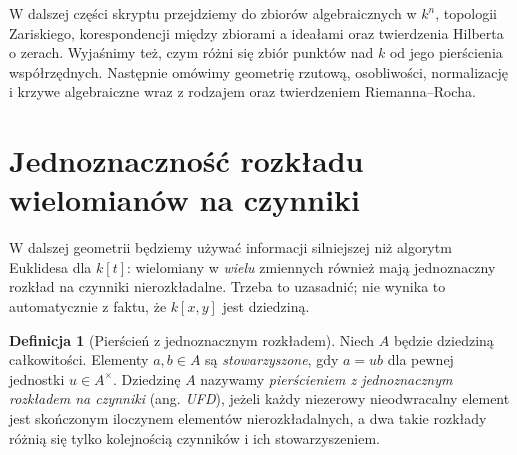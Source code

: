 \documentclass[11pt,a4paper,openany]{report}
\numberwithin{equation}{section}
\theoremstyle{plain}
\theoremstyle{definition}
\newtheorem{definicja}[twierdzenie]{Definicja}
\theoremstyle{remark}
\begin{document}
W dalszej części skryptu przejdziemy do zbiorów algebraicznych
w $k^n$, topologii Zariskiego, korespondencji między zbiorami
a ideałami oraz twierdzenia Hilberta o zerach. Wyjaśnimy też,
czym różni się zbiór punktów nad $k$ od jego pierścienia współrzędnych. Następnie
omówimy geometrię rzutową, osobliwości, normalizację i krzywe
algebraiczne wraz z rodzajem oraz twierdzeniem Riemanna--Rocha.

\section{Jednoznaczność rozkładu wielomianów na czynniki}
\label{sec:ufd-preparation}

W dalszej geometrii będziemy używać informacji silniejszej niż
algorytm Euklidesa dla $k[t]$: wielomiany w \emph{wielu} zmiennych
również mają jednoznaczny rozkład na czynniki nierozkładalne.
Trzeba to uzasadnić; nie wynika to automatycznie z faktu,
że $k[x,y]$ jest dziedziną.

\begin{definicja}[Pierścień z jednoznacznym rozkładem]
Niech $A$ będzie dziedziną całkowitości. Elementy $a,b\in A$
są \emph{stowarzyszone}, gdy $a=ub$ dla pewnej jednostki
$u\in A^\times$. Dziedzinę $A$ nazywamy \emph{pierścieniem
z jednoznacznym rozkładem na czynniki} (ang. \emph{UFD}), jeżeli
każdy niezerowy nieodwracalny element jest skończonym iloczynem
elementów nierozkładalnych, a dwa takie rozkłady różnią się
tylko kolejnością czynników i ich stowarzyszeniem.
\end{definicja}
\end{document}
